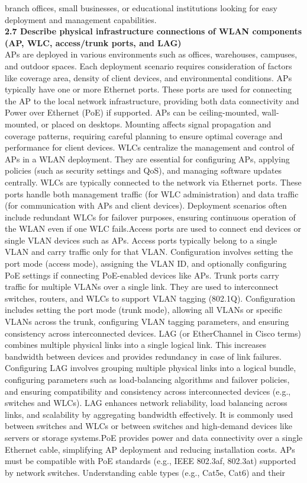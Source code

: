 \documentclass{article}
\begin{document}
branch offices, small businesses, or educational institutions looking for easy deployment and management capabilities.\\
  	
\textbf{2.7 Describe physical infrastructure connections of WLAN components (AP, WLC, access/trunk ports, and LAG)}\\

	APs are deployed in various environments such as offices, warehouses, campuses, and outdoor spaces. Each deployment scenario requires consideration of factors like coverage area, density of client devices, and environmental conditions. APs typically have one or more Ethernet ports. These ports are used for connecting the AP to the local network infrastructure, providing both data connectivity and Power over Ethernet (PoE) if supported. APs can be ceiling-mounted, wall-mounted, or placed on desktops. Mounting affects signal propagation and coverage patterns, requiring careful planning to ensure optimal coverage and performance for client devices. WLCs centralize the management and control of APs in a WLAN deployment. They are essential for configuring APs, applying policies (such as security settings and QoS), and managing software updates centrally. WLCs are typically connected to the network via Ethernet ports. These ports handle both management traffic (for WLC administration) and data traffic (for communication with APs and client devices). Deployment scenarios often include redundant WLCs for failover purposes, ensuring continuous operation of the WLAN even if one WLC fails.Access ports are used to connect end devices or single VLAN devices such as APs. Access ports typically belong to a single VLAN and carry traffic only for that VLAN. Configuration involves setting the port mode (access mode), assigning the VLAN ID, and optionally configuring PoE settings if connecting PoE-enabled devices like APs. Trunk ports carry traffic for multiple VLANs over a single link. They are used to interconnect switches, routers, and WLCs to support VLAN tagging (802.1Q). Configuration includes setting the port mode (trunk mode), allowing all VLANs or specific VLANs across the trunk, configuring VLAN tagging parameters, and ensuring consistency across interconnected devices. LAG (or EtherChannel in Cisco terms) combines multiple physical links into a single logical link. This increases bandwidth between devices and provides redundancy in case of link failures. Configuring LAG involves grouping multiple physical links into a logical bundle, configuring parameters such as load-balancing algorithms and failover policies, and ensuring compatibility and consistency across interconnected devices (e.g., switches and WLCs).  LAG enhances network reliability, load balancing across links, and scalability by aggregating bandwidth effectively. It is commonly used between switches and WLCs or between switches and high-demand devices like servers or storage systems.PoE provides power and data connectivity over a single Ethernet cable, simplifying AP deployment and reducing installation costs. APs must be compatible with PoE standards (e.g., IEEE 802.3af, 802.3at) supported by network switches. Understanding cable types (e.g., Cat5e, Cat6) and their 
\end{document}
